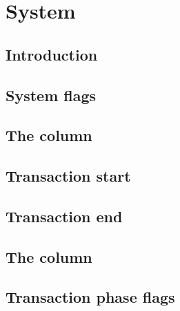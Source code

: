 






\section{System}
\subsection{Introduction}               \label{hub: system: intro}                     
\subsection{System flags}               \label{hub: system: system flags}              
\subsection{The \blockNumber{} column}  \label{hub: system: block number}              
\subsection{Transaction start}          \label{hub: system: transaction start}         
\subsection{Transaction end}            \label{hub: system: transaction end}           
\subsection{The \hubStamp{} column}     \label{hub: system: hub stamp}                 
\subsection{Transaction phase flags}    \label{hub: system: transaction phase flags}   
